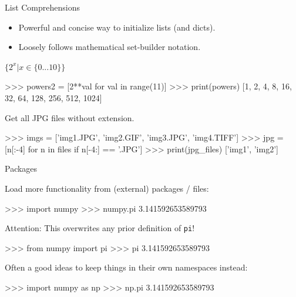 \documentclass[10pt]{beamer}
\begin{document}

\begin{frame}[fragile]{List Comprehensions}

\begin{itemize}
\item  Powerful and concise way to initialize lists (and dicts).
\item  Loosely follows mathematical set-builder notation.
\end{itemize}

$\{2^{x} | x \in \{0 ... 10\} \}$
\begin{pythoncode}
>>> powers2 = [2**val for val in range(11)]
>>> print(powers)
[1, 2, 4, 8, 16, 32, 64, 128, 256, 512, 1024]
\end{pythoncode}

Get all JPG files without extension.
\begin{pythoncode}
>>> imgs = ['img1.JPG', 'img2.GIF', 'img3.JPG', 'img4.TIFF']
>>> jpg = [n[:-4] for n in files if n[-4:] == '.JPG']
>>> print(jpg_files)
['img1', 'img2']
\end{pythoncode}

\end{frame}


\begin{frame}[fragile]{Packages}

Load more functionality from (external) packages / files:

\begin{pythoncode}
>>> import numpy
>>> numpy.pi
3.141592653589793
\end{pythoncode}



Attention: This overwrites any prior definition of \texttt{pi}!
\begin{pythoncode}
>>> from numpy import pi
>>> pi
3.141592653589793
\end{pythoncode}



Often a good ideas to keep things in their own namespaces instead:
\begin{pythoncode}
>>> import numpy as np
>>> np.pi
3.141592653589793
\end{pythoncode}

\end{frame}

\end{document}
